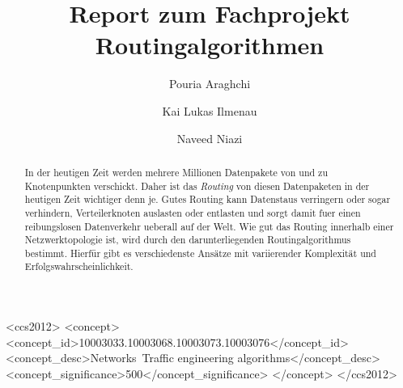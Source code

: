 \documentclass[sigconf, nonacm, review]{acmart}
\begin{document}
\title{Report zum Fachprojekt Routingalgorithmen}
\author{Pouria Araghchi}

\author{Kai Lukas Ilmenau}

\author{Naveed Niazi}

\renewcommand{\shortauthors}{Araghchi, Ilmenau, Niazi}

\begin{abstract}
In der heutigen Zeit werden mehrere Millionen Datenpakete von und zu Knotenpunkten verschickt.
Daher ist das \emph{Routing} von diesen Datenpaketen in der heutigen Zeit wichtiger denn je.
Gutes Routing kann Datenstaus verringern oder sogar verhindern, Verteilerknoten auslasten oder entlasten 
und sorgt damit fuer einen reibungslosen Datenverkehr ueberall auf der Welt.
Wie gut das Routing innerhalb einer Netzwerktopologie ist, wird durch den darunterliegenden Routingalgorithmus bestimmt.
Hierf\"ur gibt es verschiedenste Ans\"atze mit variierender Komplexit\"at und Erfolgswahrscheinlichkeit.
\end{abstract}

\begin{CCSXML}
<ccs2012>
<concept>
<concept_id>10003033.10003068.10003073.10003076</concept_id>
<concept_desc>Networks~Traffic engineering algorithms</concept_desc>
<concept_significance>500</concept_significance>
</concept>
</ccs2012>
\end{CCSXML}



\received[\"uberarbeitet]{\textcolor{red}{ausstehend}}

\maketitle
\end{document}
